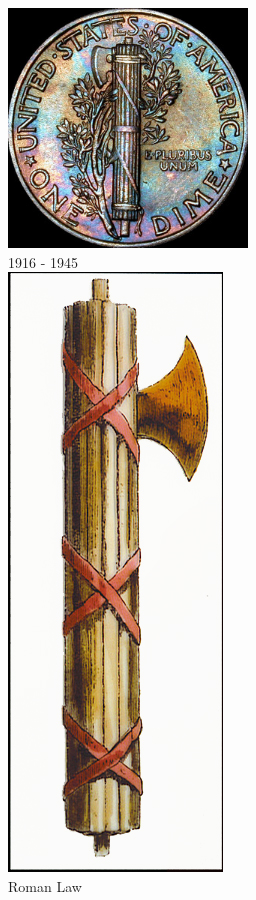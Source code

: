 \begin{frame}
    \begin{columns}[onlytextwidth]
            \centering
            \includegraphics[width=0.75\textwidth]{img/dime-usa-fasces-2.jpg} \\
            1916 - 1945 \\

            \centering
            \includegraphics[height=0.55\textheight]{img/fasces-copy.jpg} \\
            Roman Law\\

    \end{columns}
\end{frame}

